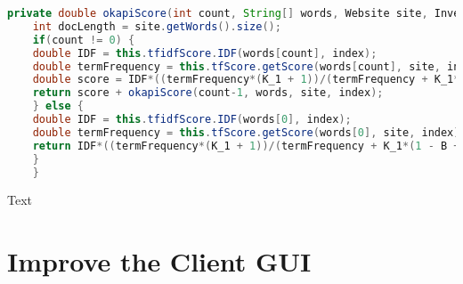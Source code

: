 \begin{lstlisting}[language=Java]
    private double okapiScore(int count, String[] words, Website site, InvertedIndex index) {
    int docLength = site.getWords().size();
    if(count != 0) {
    double IDF = this.tfidfScore.IDF(words[count], index);
    double termFrequency = this.tfScore.getScore(words[count], site, index);
    double score = IDF*((termFrequency*(K_1 + 1))/(termFrequency + K_1*(1 - B + B*(docLength/AVERAGE_DOC_LENGTH))));
    return score + okapiScore(count-1, words, site, index);
    } else {
    double IDF = this.tfidfScore.IDF(words[0], index);
    double termFrequency = this.tfScore.getScore(words[0], site, index);
    return IDF*((termFrequency*(K_1 + 1))/(termFrequency + K_1*(1 - B + B*(docLength/AVERAGE_DOC_LENGTH))));
    }
    }
\end{lstlisting}
Text \\




\section{Improve the Client GUI} %

